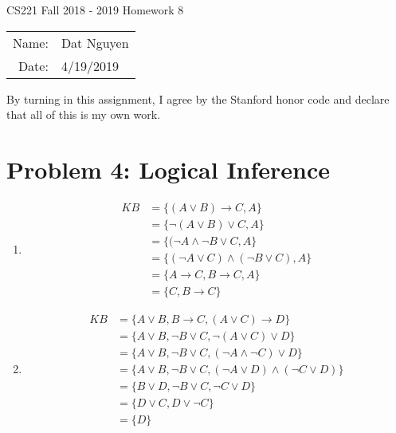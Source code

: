 \documentclass[12pt]{article}
\begin{document}
\begin{center}
{\Large CS221 Fall 2018 - 2019 Homework 8}

\begin{tabular}{rl}     
Name: & Dat Nguyen \\
Date: & 4/19/2019
\end{tabular}
\end{center}
 
 By turning in this assignment, I agree by the Stanford honor code and declare that all of this is my own work.

\section*{Problem 4: Logical Inference}
\begin{enumerate}[label=(\alph*)]
	\item
	\begin{align*}
		KB &=\{(A \lor B) \rightarrow C, A\} \\
		&=\{\neg(A \lor B) \lor C, A\} \\
		&=\{(\neg A \land \neg B \lor C, A \} \\
		&=\{(\neg A \lor C) \land (\neg B \lor C), A\} \\
		&=\{A \rightarrow C, B \rightarrow C, A\} \\
		&=\{C, B \rightarrow C\}
	\end{align*}

	\item
	\begin{align*}
		KB &= \{A \lor B, B \rightarrow C, (A \lor C) \rightarrow D\} \\
		&= \{A \lor B, \neg B \lor C, \neg(A \lor C) \lor D\} \\
		&= \{A \lor B, \neg B \lor C, (\neg A \land \neg C) \lor D\} \\
		&= \{A \lor B, \neg B \lor C, (\neg A \lor D) \land (\neg C \lor D)\} \\
		&= \{B \lor D, \neg B \lor C, \neg C \lor D \} \\
		&= \{D \lor C, D \lor \neg C\} \\
		&= \{D\}
	\end{align*}
\end{enumerate}
\end{document}
